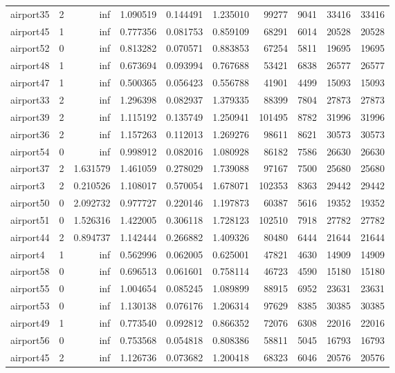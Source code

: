 \begin{longtable}{|l|r|r|r|r|r|r|r|r|r|}
airport35 & 2 & inf & 1.090519 & 0.144491 & 1.235010 & 99277 & 9041 & 33416 & 33416 \\
airport45 & 1 & inf & 0.777356 & 0.081753 & 0.859109 & 68291 & 6014 & 20528 & 20528 \\
airport52 & 0 & inf & 0.813282 & 0.070571 & 0.883853 & 67254 & 5811 & 19695 & 19695 \\
airport48 & 1 & inf & 0.673694 & 0.093994 & 0.767688 & 53421 & 6838 & 26577 & 26577 \\
airport47 & 1 & inf & 0.500365 & 0.056423 & 0.556788 & 41901 & 4499 & 15093 & 15093 \\
airport33 & 2 & inf & 1.296398 & 0.082937 & 1.379335 & 88399 & 7804 & 27873 & 27873 \\
airport39 & 2 & inf & 1.115192 & 0.135749 & 1.250941 & 101495 & 8782 & 31996 & 31996 \\
airport36 & 2 & inf & 1.157263 & 0.112013 & 1.269276 & 98611 & 8621 & 30573 & 30573 \\
airport54 & 0 & inf & 0.998912 & 0.082016 & 1.080928 & 86182 & 7586 & 26630 & 26630 \\
airport37 & 2 & 1.631579 & 1.461059 & 0.278029 & 1.739088 & 97167 & 7500 & 25680 & 25680 \\
airport3 & 2 & 0.210526 & 1.108017 & 0.570054 & 1.678071 & 102353 & 8363 & 29442 & 29442 \\
airport50 & 0 & 2.092732 & 0.977727 & 0.220146 & 1.197873 & 60387 & 5616 & 19352 & 19352 \\
airport51 & 0 & 1.526316 & 1.422005 & 0.306118 & 1.728123 & 102510 & 7918 & 27782 & 27782 \\
airport44 & 2 & 0.894737 & 1.142444 & 0.266882 & 1.409326 & 80480 & 6444 & 21644 & 21644 \\
airport4 & 1 & inf & 0.562996 & 0.062005 & 0.625001 & 47821 & 4630 & 14909 & 14909 \\
airport58 & 0 & inf & 0.696513 & 0.061601 & 0.758114 & 46723 & 4590 & 15180 & 15180 \\
airport55 & 0 & inf & 1.004654 & 0.085245 & 1.089899 & 88915 & 6952 & 23631 & 23631 \\
airport53 & 0 & inf & 1.130138 & 0.076176 & 1.206314 & 97629 & 8385 & 30385 & 30385 \\
airport49 & 1 & inf & 0.773540 & 0.092812 & 0.866352 & 72076 & 6308 & 22016 & 22016 \\
airport56 & 0 & inf & 0.753568 & 0.054818 & 0.808386 & 58811 & 5045 & 16793 & 16793 \\
airport45 & 2 & inf & 1.126736 & 0.073682 & 1.200418 & 68323 & 6046 & 20576 & 20576 \\

\end{longtable}
